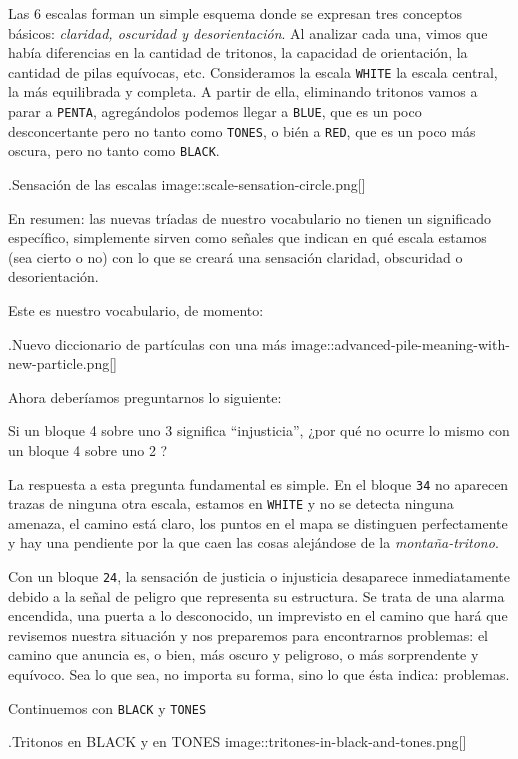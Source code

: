 \documentclass[]{article}
\begin{document}
Las 6 escalas forman un simple esquema donde se expresan tres conceptos básicos: \emph{claridad, oscuridad y   desorientación}. Al analizar cada una, vimos que había diferencias en la cantidad de tritonos, la capacidad de orientación, la cantidad de pilas equívocas, etc. Consideramos la escala \texttt{WHITE} la escala central, la más equilibrada y completa. A partir de ella, eliminando tritonos vamos a parar a \texttt{PENTA}, agregándolos podemos llegar a \texttt{BLUE}, que es un poco desconcertante pero no tanto como \texttt{TONES}, o bién a \texttt{RED}, que es un poco más oscura, pero no tanto como \texttt{BLACK}.

.Sensación de las escalas image::scale-sensation-circle.png{[}{]}

En resumen: las nuevas tríadas de nuestro vocabulario no tienen un significado específico, simplemente sirven como señales que indican en qué escala estamos (sea cierto o no) con lo que se creará una sensación claridad, obscuridad o desorientación.

Este es nuestro vocabulario, de momento:

.Nuevo diccionario de partículas con una más image::advanced-pile-meaning-with-new-particle.png{[}{]}

Ahora deberíamos preguntarnos lo siguiente:

Si un bloque 4 sobre uno 3 significa ``injusticia'', ¿por qué no ocurre lo mismo con un bloque 4 sobre uno 2 ?

La respuesta a esta pregunta fundamental es simple. En el bloque \texttt{34} no aparecen trazas de ninguna otra escala, estamos en \texttt{WHITE} y no se detecta ninguna amenaza, el camino está claro, los puntos en el mapa se distinguen perfectamente y hay una pendiente por la que caen las cosas alejándose de la \emph{montaña-tritono}.

Con un bloque \texttt{24}, la sensación de justicia o injusticia desaparece inmediatamente debido a la señal de peligro que representa su estructura. Se trata de una alarma encendida, una puerta a lo desconocido, un imprevisto en el camino que hará que revisemos nuestra situación y nos preparemos para encontrarnos problemas: el camino que anuncia es, o bien, más oscuro y peligroso, o más sorprendente y equívoco. Sea lo que sea, no importa su forma, sino lo que ésta indica: problemas.

Continuemos con \texttt{BLACK} y \texttt{TONES}

.Tritonos en BLACK y en TONES image::tritones-in-black-and-tones.png{[}{]}
\end{document}
